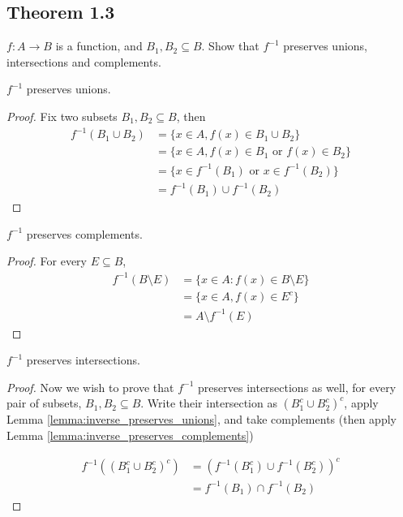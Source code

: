 \documentclass[../../main.tex]{subfiles}
\begin{document}
\subsection{Theorem 1.3}
\begin{wts}\label{theorem:inverse preserves unions,intersections, and complements}
   $f: A \to B$ is a function, and $B_1, B_2\subseteq B$. Show that $f^{-1}$ preserves unions, intersections and complements.
\end{wts}
\begin{lemma}\label{lemma:inverse_preserves_unions}
    $f^{-1}$ preserves unions.
\end{lemma}
\begin{proof}
    Fix two subsets $B_1, B_2\subseteq B$, then 
    \begin{align*}
        f^{-1}(B_1\cup B_2) &= \{x\in A, f(x) \in B_1\cup B_2\}\\[2ex]
        &= \{x\in A, f(x) \in B_1 \text{ or } f(x) \in B_2\}\\[2ex]
        &= \{x\in f^{-1}(B_1) \text{ or } x\in f^{-1}(B_2)\}\\[2ex]
        &= f^{-1}(B_1)\cup f^{-1}(B_2)
    \end{align*}
\end{proof} %

\begin{lemma}\label{lemma:inverse_preserves_complements}
    $f^{-1}$ preserves complements.
\end{lemma}
\begin{proof}
    For every $E\subseteq B$, 
    \begin{align*}
        f^{-1}(B\setminus E) &= \{x\in A:f(x)\in B\setminus E\}\\
        &=\{x\in A, f(x)\in E^c\}\\
        &= A\setminus f^{-1}(E)
    \end{align*}
\end{proof}

\begin{lemma}\label{lemma:inverse_preserves_intersections}
    $f^{-1}$ preserves intersections.
\end{lemma}
\begin{proof}
    Now we wish to prove that $f^{-1}$ preserves intersections as well, for every pair of subsets, $B_1, B_2\subseteq B$. Write their intersection as $(B_1^c\cup B_2^c)^c$, apply Lemma \eqref{lemma:inverse_preserves_unions}, and take complements (then apply Lemma \eqref{lemma:inverse_preserves_complements})

    \begin{align*}
        f^{-1}\left((B_1^c\cup B_2^c)^c\right) &= (f^{-1}(B_1^c)\cup f^{-1}(B_2^c))^c\\
        &=f^{-1}(B_1)\cap f^{-1}(B_2)
    \end{align*}
\end{proof}
\end{document}
